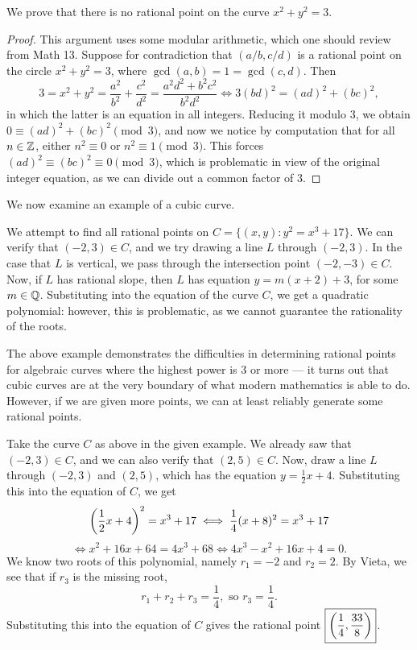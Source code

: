 \documentclass{article}
\begin{document}
\begin{example}
We prove that there is no rational point on the curve $x^2 + y^2 =3$.
\end{example}
\begin{proof}
This argument uses some modular arithmetic, which one should review from Math 13. Suppose for contradiction that $(a/b, c/d)$ is a rational point on the circle $x^2 + y^2 =3$, where $\gcd(a,b) = 1 = \gcd(c,d)$. Then
$$3 = x^2+y^2 = \frac{a^2}{b^2} +\frac{c^2}{d^2} = \frac{a^2d^2 + b^2c^2}{b^2d^2} \iff 3(bd)^2 = (ad)^2 + (bc)^2,$$
in which the latter is an equation in all integers. Reducing it modulo $3$, we obtain $0\equiv (ad)^2 + (bc)^2 \pmod 3$, and now we notice by computation that for all $n\in\mathbb Z$, either $n^2\equiv 0$ or $n^2\equiv 1\pmod 3$. This forces $(ad)^2 \equiv (bc)^2 \equiv 0\pmod 3$, which is problematic in view of the original integer equation, as we can divide out a common factor of $3$.
\end{proof}

We now examine an example of a cubic curve.
\begin{example}
We attempt to find all rational points on $C = \{(x,y): y^2 = x^3 + 17\}$. We can verify that $(-2, 3)\in C$, and we try drawing a line $L$ through $(-2, 3)$. In the case that $L$ is vertical, we pass through the intersection point $(-2, -3)\in C$. Now, if $L$ has rational slope, then $L$ has equation $y = m(x+2) + 3$, for some $m\in\mathbb Q$. Substituting into the equation of the curve $C$, we get a quadratic polynomial: however, this is problematic, as we cannot guarantee the rationality of the roots.
\end{example}

The above example demonstrates the difficulties in determining rational points for algebraic curves where the highest power is $3$ or more --- it turns out that cubic curves are at the very boundary of what modern mathematics is able to do. However, if we are given more points, we can at least reliably generate some rational points.
\begin{example}
Take the curve $C$ as above in the given example. We already saw that $(-2, 3)\in C$, and we can also verify that $(2, 5)\in C$. Now, draw a line $L$ through $(-2, 3)$ and $(2, 5)$, which has the equation $y = \frac 12x + 4$. Substituting this into the equation of $C$, we get
$$\left(\frac 12x+4 \right)^2 = x^3 + 17 \iff \frac 14(x+8)^2 = x^3 + 17$$
\newpage
$$\iff x^2 + 16x + 64 = 4x^3 + 68 \iff 4x^3 - x^2 + 16x + 4 = 0.$$
We know two roots of this polynomial, namely $r_1 = -2$ and $r_2 = 2$. By Vieta, we see that if $r_3$ is the missing root,
$$r_1 + r_2 + r_3 = \frac 14, \text{ so } r_3 = \frac 14.$$
Substituting this into the equation of $C$ gives the rational point $\boxed{\left(\frac 14, \frac{33}8 \right)}$.
\end{example}
\end{document}
